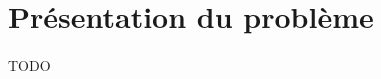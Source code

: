 \documentclass[12pt,letterpaper,twoside]{article}
\begin{document}
	\maketitle{}
	\section{Présentation du problème}
		\paragraph*{}
			TODO
	\newpage\printbibliography[heading=bibintoc]{}
\end{document}
